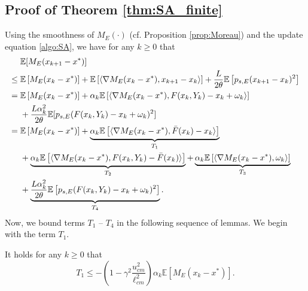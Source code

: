 \documentclass[11 pt]{article}
\begin{document}
	\subsection{Proof of Theorem \ref{thm:SA_finite}} 
	\label{proof: general finite-sample bound}
	Using the smoothness of $M_E(\cdot)$ (cf. Proposition \ref{prop:Moreau}) and the update equation \eqref{algo:SA}, we have for any $k\geq 0$ that
	\begin{align}\label{eq:error decomposition}
		&\mathbb{E}[M_E(x_{k+1}-x^*)]\nonumber\\
		\leq\;& \mathbb{E}\left[M_E(x_k-x^*)\right]+\mathbb{E}\left[\langle\nabla M_E(x_k-x^*),x_{k+1}-x_k\rangle\right]+\frac{L}{2\theta}\mathbb{E}\left[p_{s,E}(x_{k+1}-x_k)^2\right]\nonumber\\
		=\;& \mathbb{E}\left[M_E(x_k-x^*)\right]+\alpha_k\mathbb{E}\left[\langle\nabla M_E(x_k-x^*),F(x_k,Y_k)-x_k+\omega_k\rangle\right]\nonumber\\
		&+ \frac{L\alpha_k^2}{2\theta}\mathbb{E}[p_{s,E}(F(x_k,Y_k)-x_k+\omega_k)^2]\nonumber\\
		=\;& \mathbb{E}\left[M_E(x_k-x^*)\right]+\underbrace{\alpha_k\mathbb{E}\left[\langle\nabla M_E(x_k-x^*),\Bar{F}(x_k)-x_k\rangle\right]}_{T_1}\nonumber\\
		&+\underbrace{\alpha_k\mathbb{E}\left[\langle\nabla M_E(x_k-x^*),F(x_k,Y_k)-\Bar{F}(x_k)\rangle\right]}_{T_2} + \underbrace{\alpha_k\mathbb{E}\left[\langle\nabla M_E(x_k-x^*),\omega_k\rangle\right]}_{T_3}\nonumber\\
		&+\underbrace{\frac{L\alpha_k^2}{2\theta}\mathbb{E}\left[p_{s,E}(F(x_k,Y_k)-x_k+\omega_k)^2\right]}_{T_4}.
	\end{align}
	Now, we bound terms $T_1$ -- $T_4$ in the following sequence of lemmas. We begin with the term $T_1$.
	\begin{lemma}\label{le:T_1}
		It holds for any $k\geq 0$ that $$T_1\leq -\left(1-\gamma^2 \frac{u^2_{cm}}{\ell^2_{cm}}\right)\alpha_k\mathbb{E}[M_E(x_k-x^*)].$$
	\end{lemma}
\end{document}
